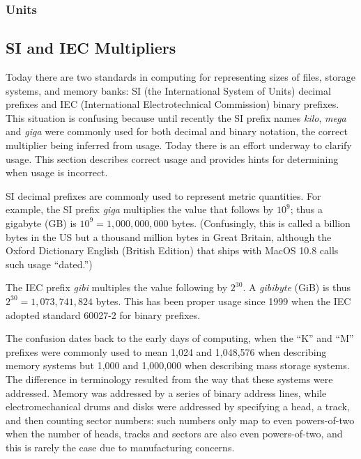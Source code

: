 \subsubsection{Units}


\subsection{SI and IEC Multipliers}

Today there are two standards in computing for representing sizes of
files, storage systems, and memory banks: SI (the International System
of Units) decimal prefixes and IEC (International Electrotechnical
Commission) binary prefixes. This situation is confusing because until
recently the SI prefix names \emph{kilo}, \emph{mega} and \emph{giga} were commonly used
for both decimal and binary notation, the correct multiplier being
inferred from usage. Today there is an effort underway to clarify
usage. This section describes correct usage and provides hints for
determining when usage is incorrect.

SI decimal prefixes are commonly used to represent metric
quantities. For example, the SI prefix \emph{giga} multiplies the value that follows by
$10^9$; thus a gigabyte (GB) is
$10^9=1,000,000,000$ bytes. (Confusingly, this is called a billion bytes
in the US but a thousand million bytes in Great Britain, although the
Oxford Dictionary English (British Edition) that ships with MacOS 10.8
calls such usage ``dated.'')

The IEC prefix \emph{gibi} multiples the value following by $2^{30}$. A \emph{gibibyte}
(GiB) is thus $2^{30}=1,073,741,824$ bytes. This has been proper usage
since 1999 when the IEC adopted standard 60027-2 for binary prefixes.

The confusion dates back to the early days of computing, when the ``K''
and ``M'' prefixes were commonly used to mean 1,024 and 1,048,576
when describing memory systems but 1,000 and 1,000,000 when
describing mass storage systems. The difference in terminology resulted
from the way that these systems were addressed. Memory was addressed
by a series of binary address lines, while electromechanical drums and
disks were addressed by specifying a head, a track, and then counting
sector numbers: such numbers only map to even powers-of-two when the
number of heads, tracks and sectors are also even powers-of-two, and
this is rarely the case due to manufacturing concerns.

